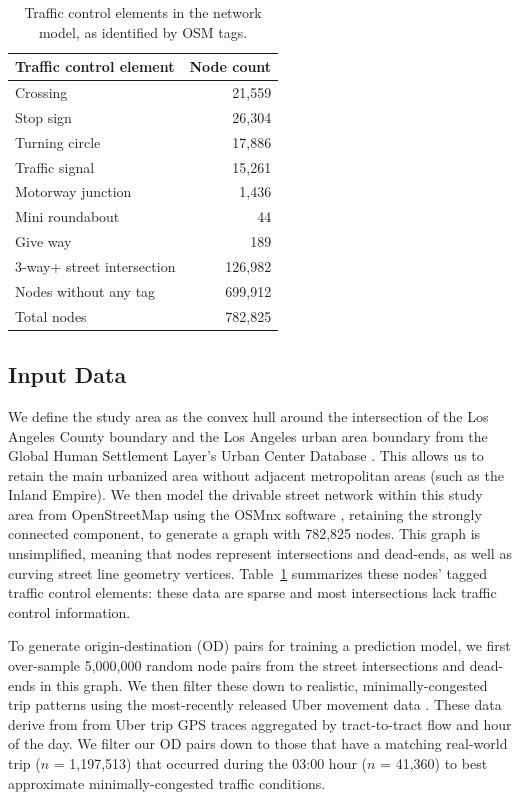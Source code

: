 \documentclass[12pt,letterpaper]{article} %
\begin{document}
\begin{table}[hbt!]
    \centering
    \caption{Traffic control elements in the network model, as identified by OSM tags.}\label{tab:node_count}
    \begin{tabular}{lr}
        \toprule
        Traffic control element    & Node count \\ \midrule
        Crossing                   &     21,559 \\
        Stop sign                  &     26,304 \\
        Turning circle             &     17,886 \\
        Traffic signal             &     15,261 \\
        Motorway junction          &      1,436 \\
        Mini roundabout            &         44 \\
        Give way                   &        189 \\
        3-way+ street intersection &    126,982 \\
        Nodes without any tag      &    699,912 \\
        Total nodes                &    782,825 \\ \bottomrule
    \end{tabular}
\end{table}

\subsection{Input Data}

We define the study area as the convex hull around the intersection of the Los Angeles County boundary and the Los Angeles urban area boundary from the Global Human Settlement Layer's Urban Center Database \citep{florczyk2019description, GHS2019}. This allows us to retain the main urbanized area without adjacent metropolitan areas (such as the Inland Empire). We then model the drivable street network within this study area from OpenStreetMap using the OSMnx software \citep{boeing_modeling_2025}, retaining the strongly connected component, to generate a graph with 782,825 nodes. This graph is unsimplified, meaning that nodes represent intersections and dead-ends, as well as curving street line geometry vertices. Table~\ref{tab:node_count} summarizes these nodes' tagged traffic control elements: these data are sparse and most intersections lack traffic control information.

To generate origin-destination (OD) pairs for training a prediction model, we first over-sample 5,000,000 random node pairs from the street intersections and dead-ends in this graph. We then filter these down to realistic, minimally-congested trip patterns using the most-recently released Uber movement data \citep{ubermovement2020}. These data derive from from Uber trip GPS traces aggregated by tract-to-tract flow and hour of the day. We filter our OD pairs down to those that have a matching real-world trip ($n$ = 1,197,513) that occurred during the 03:00 hour ($n$ = 41,360) to best approximate minimally-congested traffic conditions.
\end{document}
